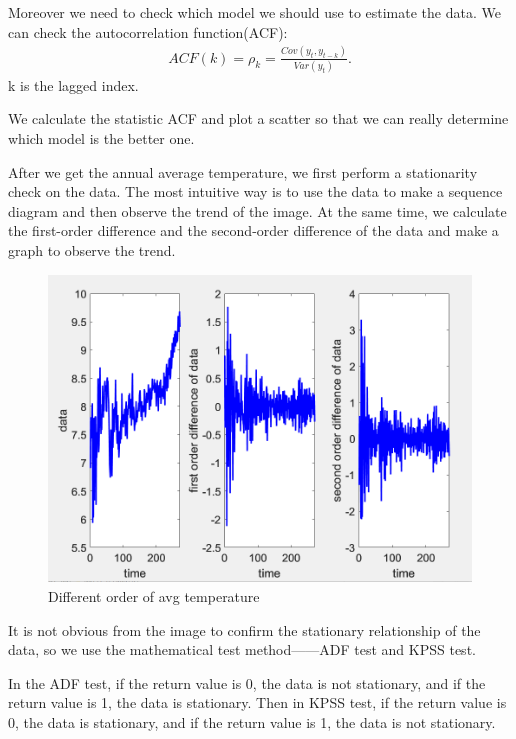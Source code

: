 \documentclass{apmcmthesis}
\begin{document}
  Moreover we need to check which model we should use to estimate the data.
  We can check the autocorrelation function(ACF):
  \begin{align*}
    ACF(k)=\rho_k = \frac{Cov(y_t,y_{t-k})}{Var(y_t)}.
  \end{align*}
  k is the lagged index.
  
  We calculate the statistic ACF and plot a scatter so that we can really determine which model is the better one.
  
  After we get the annual average temperature, we first perform a stationarity check on the data. The most intuitive way is to use the data to make a sequence diagram and then observe the trend of the image. At the same time, we calculate the first-order difference and the second-order difference of the data and make a graph to observe the trend.
  
  \begin{figure}[htbp]
    \centering
    \includegraphics[scale=0.35]{Smoothness Analysis.png}
    \caption{Different order of avg temperature}
  \end{figure}
  
  It is not obvious from the image to confirm the stationary relationship of the data, so we use the mathematical test method——ADF test and KPSS test.
  
  In the ADF test, if the return value is 0, the data is not stationary, and if the return value is 1, the data is stationary. Then in KPSS test, if the return value is 0, the data is stationary, and if the return value is 1, the data is not stationary.
  
\end{document}
